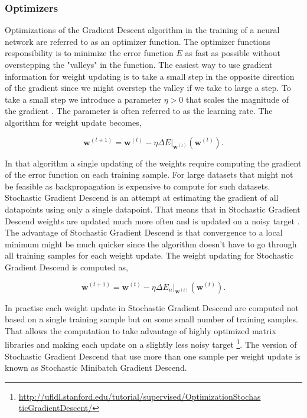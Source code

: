 \subsubsection{Optimizers}

Optimizations of the Gradient Descent algorithm in the training of a neural
network are referred to as an optimizer function. The optimizer functions
responsibility is to minimize the error function $E$ as fast as possible
without overstepping the "valleys" in the function. The easiest way to use
gradient information for weight updating is to take a small step in the opposite
direction of the gradient since we might overstep the valley if we take to large
a step. To take a small step we introduce a parameter $\eta > 0$ that scales the
magnitude of the gradient \cite{Bishop}. The parameter is often referred to as
the learning rate. The algorithm for weight update becomes,

\begin{equation}
    \mathbf{w}^{(t+1)} =
        \mathbf{\mathbf{w}}^{(t)} -
        \eta\Delta E|_{\mathbf{w}^{(t)}}\left(\mathbf{w}^{(t)}\right).
\end{equation}

In that algorithm a single updating of the weights require computing the
gradient of the error function on each training sample. For large datasets
that might not be feasible as backpropagation is expensive to compute for such
datasets. Stochastic Gradient Descend is an attempt at estimating the gradient
of all datapoints using only a single datapoint. That means that in Stochastic
Gradient Descend weights are updated much more often and is updated on a noisy
target \cite{Bishop}. The advantage of Stochastic Gradient Descend is that
convergence to a local minimum might be much quicker since the algorithm doesn't
have to go through all training samples for each weight update. The weight
updating for Stochastic Gradient Descend is computed as,

\begin{equation}
    \mathbf{w}^{(t+1)} =
        \mathbf{\mathbf{w}}^{(t)} -
        \eta\Delta E_n|_{\mathbf{w}^{(t)}}\left(\mathbf{w}^{(t)}\right).
\end{equation}

In practise each weight update in Stochastic Gradient Descend are computed
not based on a single training sample but on some small number of training
samples. That allows the computation to take advantage of highly optimized
matrix libraries and making each update on a slightly less noisy target
\footnote{\url{http://ufldl.stanford.edu/tutorial/supervised/OptimizationStochas
ticGradientDescent/}}. The version of Stochastic Gradient Descend that use more
than one sample per weight update is known as Stochastic Minibatch Gradient
Descend.

